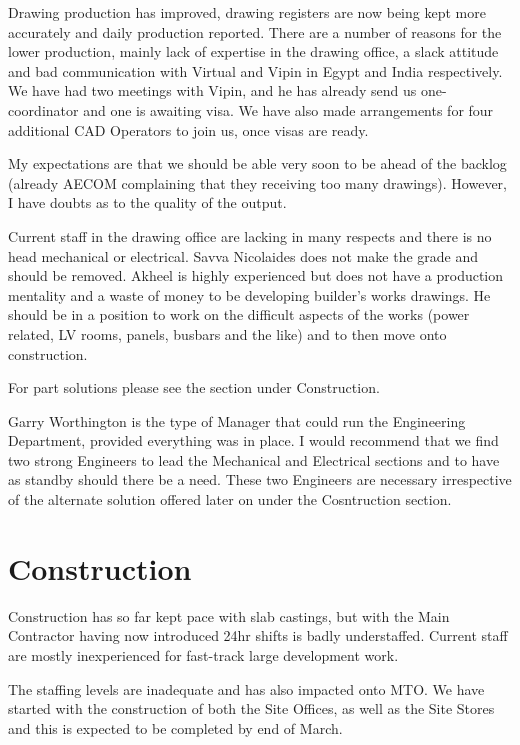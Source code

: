 Drawing production has improved, drawing registers are now being kept more accurately and  daily production reported.  There are a number of  reasons for the lower production, mainly lack of expertise in the drawing office, a slack attitude and bad communication with Virtual and Vipin in Egypt and India respectively.  We have had two meetings with Vipin, and he has already send us one-coordinator and one is awaiting visa. We have also made arrangements for four additional CAD Operators to join us, once visas are ready. 

My expectations are that we should be able very soon to be ahead of the backlog (already AECOM complaining that they receiving too many drawings). However, I have doubts as to the quality of the output.

Current staff in the drawing office are lacking in many respects and there is no head mechanical or electrical. Savva Nicolaides does not make the grade and should be removed. Akheel is highly experienced but does not have a production mentality and a waste of money to be developing builder's works drawings. He should be in a position to work on the difficult aspects of the works (power related, LV rooms, panels, busbars and the like) and to then move onto construction.

For part solutions please see the section under Construction.

Garry Worthington is the type of Manager that could run the Engineering Department, provided everything was in place. I would recommend that we find two strong Engineers to lead the Mechanical and Electrical sections and to have as standby should there be a need. These two Engineers are necessary irrespective of the alternate solution offered later on under the Cosntruction section.



\section*{Construction}

Construction has so far kept pace with slab castings, but with the Main Contractor having now introduced 24hr shifts is badly understaffed. Current staff are mostly inexperienced for fast-track large development work. 

The staffing levels are inadequate and has also impacted onto MTO. We have started with the construction of both the Site Offices, as well as the Site Stores and this is expected to be completed by end of March.

